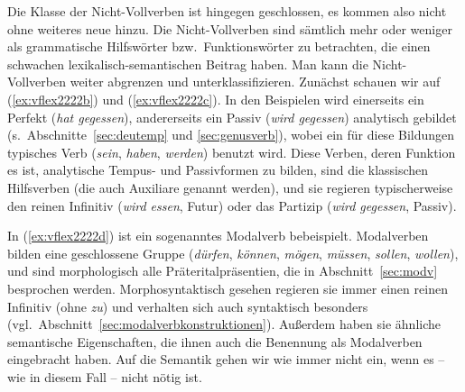 Die Klasse der Nicht-Vollverben ist hingegen geschlossen, es kommen also nicht ohne weiteres neue hinzu.
Die Nicht-Vollverben sind sämtlich mehr oder weniger als grammatische Hilfswörter bzw.\ Funktionswörter zu betrachten, die einen schwachen lexikalisch-semantischen Beitrag haben.
Man kann die Nicht-Vollverben weiter abgrenzen und unterklassifizieren.
Zunächst schauen wir auf (\ref{ex:vflex2222b}) und (\ref{ex:vflex2222c}).
In den Beispielen wird einerseits ein Perfekt (\textit{hat gegessen}), andererseits ein Passiv (\textit{wird gegessen}) analytisch gebildet (s.\ Abschnitte~\ref{sec:deutemp} und \ref{sec:genusverb}), wobei ein für diese Bildungen typisches Verb (\textit{sein}, \textit{haben}, \textit{werden}) benutzt wird.
Diese Verben, deren Funktion es ist, analytische Tempus- und Passivformen zu bilden, sind die klassischen Hilfsverben (die auch Auxiliare genannt werden), und sie regieren typischerweise den reinen Infinitiv (\textit{wird essen}, Futur) oder das Partizip (\textit{wird gegessen}, Passiv).


In (\ref{ex:vflex2222d}) ist ein sogenanntes Modalverb bebeispielt.
Modalverben bilden eine geschlossene Gruppe (\textit{dürfen}, \textit{können}, \textit{mögen}, \textit{müssen}, \textit{sollen}, \textit{wollen}), und sind morphologisch alle Präteritalpräsentien, die in Abschnitt~\ref{sec:modv} besprochen werden.
Morphosyntaktisch gesehen regieren sie immer einen reinen Infinitiv (ohne \textit{zu}) und verhalten sich auch syntaktisch besonders (vgl.\ Abschnitt~\ref{sec:modalverbkonstruktionen}).
Außerdem haben sie ähnliche semantische Eigenschaften, die ihnen auch die Benennung als Modalverben eingebracht haben.
Auf die Semantik gehen wir wie immer nicht ein, wenn es -- wie in diesem Fall -- nicht nötig ist.


